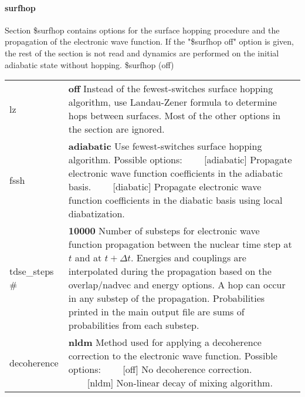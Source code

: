 \documentclass{report}
\newcommand{\tabitem}{~~\llap{--}~~}
\begin{document}
\paragraph{surfhop}
Section \$surfhop contains options for the surface hopping procedure and the propagation of the electronic wave function. If the "\$surfhop off" option is given, the rest of the section is not read and dynamics are performed on the initial adiabatic state without hopping. \newline
\$surfhop (off)


\begin{tabularx}{\textwidth}{ m{2.5cm} X }
lz				&
	\textbf{off}	\newline
	Instead of the fewest-switches surface hopping algorithm, use Landau-Zener formula to determine hops between surfaces. Most of the other options in the section are ignored.\\
	
fssh			&
	\textbf{adiabatic}	\newline
	Use fewest-switches surface hopping algorithm. Possible options: \newline
	\tabitem [adiabatic] Propagate electronic wave function coefficients in the adiabatic basis. 
	\tabitem [diabatic] Propagate electronic wave function coefficients in the diabatic basis using local diabatization.\\

tdse\_steps \#	&
	\textbf{10000}	\newline 
	Number of substeps for electronic wave function propagation between the nuclear time step at $t$ and at $t + \Delta t$. Energies and couplings are interpolated during the propagation based on the overlap/nadvec and energy options. A hop can occur in any substep of the propagation. Probabilities printed in the main output file are sums of probabilities from each substep. \\

decoherence		&
	\textbf{nldm}	\newline 
	Method used for applying a decoherence correction to the electronic wave function. Possible options: \newline				
	\tabitem [off] No decoherence correction. \newline
	\tabitem [nldm] Non-linear decay of mixing algorithm. \\


\end{tabularx}
\end{document}
